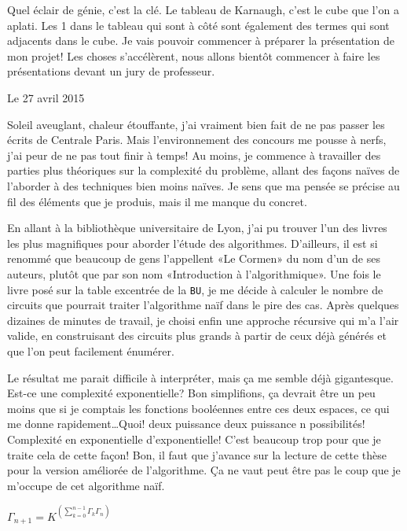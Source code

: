 \documentclass[12pt,final]{report} %
\newcommand{\datemarge}[1]{%
   \newpage
   
        {\hfill{\color{blue}#1}}

}
\newcommand{\majuscule}[1]{{\large \texttt{#1}}}
\begin{document}
\begin{cursive}
{Quel éclair de génie, c'est la clé. Le tableau de Karnaugh, c'est le cube que l'on a aplati.
Les 1 dans le tableau qui sont à côté sont également des termes qui sont adjacents dans le cube.
Je vais pouvoir commencer à préparer la présentation de mon projet!
Les choses s'accélèrent, nous allons bientôt commencer à faire les présentations devant un jury de professeur.

\datemarge{Le 27 avril 2015}

Soleil aveuglant, chaleur étouffante, j'ai vraiment bien fait de ne pas passer les écrits de Centrale Paris.
Mais l'environnement des concours me pousse à nerfs, j'ai peur de ne pas tout finir à temps!
Au moins, je commence à travailler des parties plus théoriques sur la complexité du problème, allant des façons naïves de l'aborder à des techniques bien moins naïves.
Je sens que ma pensée se précise au fil des éléments que je produis, mais il me manque du concret.

En allant à la bibliothèque universitaire de Lyon, j'ai pu trouver l'un des livres les plus magnifiques pour aborder l'étude des algorithmes. 
D'ailleurs, il est si renommé que beaucoup de gens l'appellent «Le Cormen» du nom d'un de ses auteurs, plutôt que par son nom «Introduction à l'algorithmique».
Une fois le livre posé sur la table excentrée de la \majuscule{BU}, je me décide à calculer le nombre de circuits que pourrait traiter l'algorithme naïf dans le pire des cas.
Après quelques dizaines de minutes de travail, je choisi enfin une approche récursive qui m'a l'air valide, en construisant des circuits plus grands à partir de ceux déjà générés et que l'on peut facilement énumérer.

Le résultat me parait difficile à interpréter, mais ça me semble déjà gigantesque. Est-ce une complexité exponentielle?
Bon simplifions, ça devrait être un peu moins que si je comptais les fonctions booléennes entre ces deux espaces, ce qui me donne rapidement\dots Quoi! deux puissance deux puissance n possibilités! Complexité en exponentielle d'exponentielle!
C'est beaucoup trop pour que je traite cela de cette façon!
Bon, il faut que j'avance sur la lecture de cette thèse pour la version améliorée de l'algorithme.
Ça ne vaut peut être pas le coup que je m'occupe de cet algorithme naïf.
\vspace{0.4cm}
\begin{center}$\Gamma_{n+1} = K^{\left(\sum_{k=0}^{n-1} \Gamma_k \Gamma_n\right)}$\end{center}


}
\end{cursive}
\end{document}
